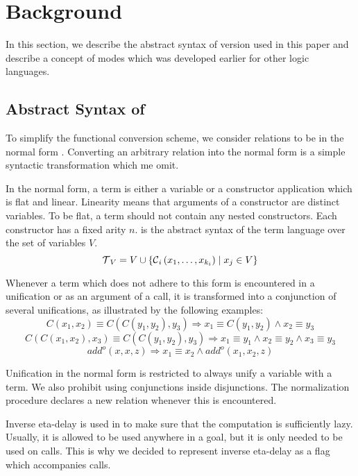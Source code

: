 \section{Background}

In this section, we describe the abstract syntax of \mk version used in this paper and describe a concept of modes which was developed earlier for other logic languages.

\subsection{Abstract Syntax of \mk}

To simplify the functional conversion scheme, we consider \mk relations to be in the normal form .
Converting an arbitrary \mk relation into the normal form is a simple syntactic transformation which me omit.

In the normal form, a term is either a variable or a constructor application which is flat and linear.
Linearity means that arguments of a constructor are distinct variables.
To be flat, a term should not contain any nested constructors.
Each constructor has a fixed arity $n$.
 is the abstract syntax of the term language over the set of variables $V$.
\[  \operatorname{\mathcal{T}}_{V} = V \cup \{\operatorname{\mathcal{C}}_{i}\left( x_1, \ldots, x_{k_{i}} \right) \mid x_{j}\in V\} \]

Whenever a term which does not adhere to this form is encountered in a unification or as an argument of a call, it is transformed into a conjunction of several unifications, as illustrated by the following examples:
\[ C\left( x_1, x_2 \right) \equiv C\left( C\left( y_1, y_2 \right), y_3 \right) \Rightarrow x_1 \equiv C\left( y_1, y_2 \right) \land x_2 \equiv y_3   \]
\[ C\left( C\left( x_1, x_2 \right), x_3 \right) \equiv C\left( C\left( y_1, y_2 \right), y_3 \right) \Rightarrow x_1 \equiv y_1 \land x_2 \equiv y_2 \land x_3 \equiv y_3   \]
\[add^o\left( x, x, z \right) \Rightarrow x_1 \equiv x_2 \land add^o\left( x_1, x_2, z \right) \]

Unification in the normal form is restricted to always unify a variable with a term.
We also prohibit using conjunctions inside disjunctions.
The normalization procedure declares a new relation whenever this is encountered.

Inverse eta-delay is used in \mk to make sure that the computation is sufficiently lazy.
Usually, it is allowed to be used anywhere in a goal, but it is only needed to be used on calls.
This is why we decided to represent inverse eta-delay as a flag which accompanies calls.

